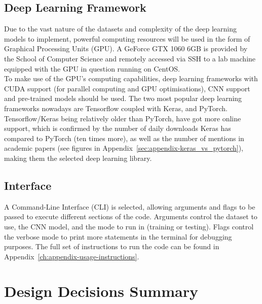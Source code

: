 \subsection{Deep Learning Framework}

Due to the vast nature of the datasets and complexity of the deep learning models to implement, powerful computing resources will be used in the form of Graphical Processing Units (GPU). A GeForce GTX 1060 6GB is provided by the School of Computer Science and remotely accessed via SSH to a lab machine equipped with the GPU in question running on CentOS.\\

To make use of the GPU's computing capabilities, deep learning frameworks with CUDA support (for parallel computing and GPU optimisations), CNN support and pre-trained models should be used. The two most popular deep learning frameworks nowadays are Tensorflow coupled with Keras, and PyTorch. Tensorflow/Keras being relatively older than PyTorch, have got more online support, which is confirmed by the number of daily downloads Keras has compared to PyTorch (ten times more), as well as the number of mentions in academic papers (see figures  in Appendix~\ref{sec:appendix-keras_vs_pytorch}), making them the selected deep learning library.

\subsection{Interface}

A Command-Line Interface (CLI) is selected, allowing arguments and flags to be passed to execute different sections of the code. Arguments control the dataset to use, the CNN model, and the mode to run in (training or testing). Flags control the verbose mode to print more statements in the terminal for debugging purposes. The full set of instructions to run the code can be found in Appendix~\ref{ch:appendix-usage-instructions}.


\section{Design Decisions Summary}

